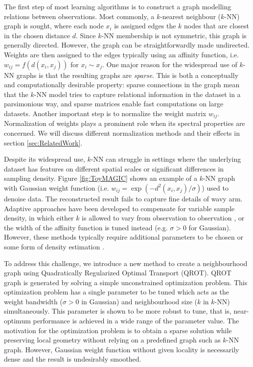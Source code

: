 \documentclass{article}
\newcommand{\red}[1]{\textcolor{red}{#1}}
\begin{document}
The first step of most learning algorithms is to construct a graph modelling relations between observations. Most commonly, a $k$-nearest neighbour ($k$-NN) graph is sought, where each node $x_i$ is assigned edges the $k$ nodes that are closest in the chosen distance $d$. Since $k$-NN membership is not symmetric, this graph is generally directed. However, the graph can be straightforwardly made undirected. Weights are then assigned to the edges typically using an affinity function, i.e. $w_{ij} = f(d(x_i, x_j))$ for $x_i \sim x_j$. One major reason for the widespread use of $k$-NN graphs is that the resulting graphs are \emph{sparse}. This is both a conceptually and computationally desirable property: sparse connections in the graph mean that the $k$-NN model tries to capture relational information in the dataset in a parsimonious way, and sparse matrices enable fast computations on large datasets. 
Another important step is to normalize the weight matrix $w_{ij}$. Normalization of weights plays a prominent role when its spectral properties are concerned. We will discuss different normalization methods and their effects in section \ref{sec:RelatedWork}.

Despite its widespread use, $k$-NN can struggle in settings where the underlying dataset has features on different spatial scales or significant differences in sampling density. 
Figure \ref{fig:ToyMAGIC} shows an example of a $k$-NN graph with Gaussian weight function (i.e. $w_{ij} = \exp\left( -d^2(x_i, x_j)/\sigma\right)$) used to denoise data. The reconstructed result fails to capture fine details of wavy arm.
Adaptive approaches have been developed to compensate for variable sample density, in which either $k$ is allowed to vary from observation to observation \cite{balsubramani2019adaptive}, or the width of the affinity function is tuned instead \cite{van2018recovering} (e.g. $\sigma >0$ for Gaussian). However, these methods typically require additional parameters to be chosen \cite{balsubramani2019adaptive, van2018recovering} or some form of density estimation \cite{coifman2005geometric}.

To address this challenge, we introduce a new method to create a neighbourhood graph using Quadratically Regularized Optimal Transport (QROT). 
QROT graph is generated by solving a simple unconstrained optimization problem. This optimization problem has a single parameter to be tuned which acts as the weight bandwidth ($\sigma >0$ in Gaussian) and neighbourhood size ($k$ in $k$-NN) simultaneously. 
This parameter is shown to be more robust to tune, that is, near-optimum performance is achieved in a wide range of the parameter value. 
The motivation for the optimization problem is to obtain a sparse solution while preserving local geometry without relying on a predefined graph such as $k$-NN graph.
However, Gaussian weight function without given locality is necessarily dense and the result is undesirably smoothed. 
\end{document}
